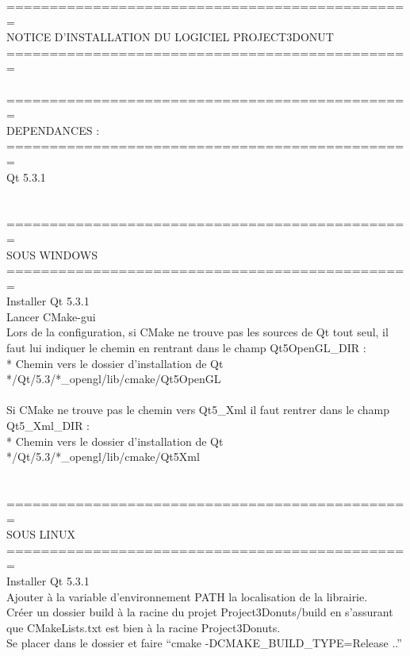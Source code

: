 ===============================================\\
NOTICE D'INSTALLATION DU LOGICIEL PROJECT3DONUT\\
===============================================\\
\\
===============================================\\
DEPENDANCES :\\
===============================================\\
Qt 5.3.1\\
\\
\\
===============================================\\
SOUS WINDOWS\\
===============================================\\
Installer Qt 5.3.1\\

Lancer CMake-gui\\

Lors de la configuration, si CMake ne trouve pas les sources de Qt tout seul, il faut lui indiquer le chemin en rentrant dans le champ Qt5OpenGL\_DIR :\\
	* Chemin vers le dossier d'installation de Qt */Qt/5.3/*\_opengl/lib/cmake/Qt5OpenGL\\
	\\
Si CMake ne trouve pas le chemin vers Qt5\_Xml il faut rentrer dans le champ Qt5\_Xml\_DIR :\\
	* Chemin vers le dossier d'installation de Qt */Qt/5.3/*\_opengl/lib/cmake/Qt5Xml\\
	\\
	\\
===============================================\\
SOUS LINUX\\
===============================================\\
Installer Qt 5.3.1\\

Ajouter à la variable d'environnement PATH la localisation de la librairie. \\

Créer un dossier build à la racine du projet Project3Donuts/build en s'assurant que CMakeLists.txt est bien à la racine Project3Donuts.\\

Se placer dans le dossier et faire ``cmake -DCMAKE\_BUILD\_TYPE=Release ..''\\

